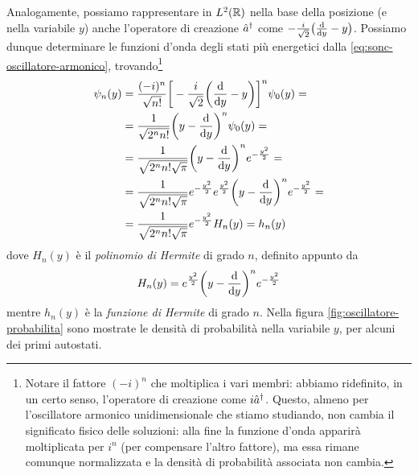 Analogamente, possiamo rappresentare in $L^2(\mathbb{R})$ nella base della posizione (e nella variabile $y$) anche l'operatore di creazione ${\hat{a}}^\dagger$ come $-\frac{i}{\sqrt{2}}\big(\frac{\textup{d} {}}{\textup{d} {y}}-y\big)$.
Possiamo dunque determinare le funzioni d'onda degli stati più energetici dalla \eqref{eq:sonc-oscillatore-armonico}, trovando\footnote{Notare il fattore $(-i)^n$ che moltiplica i vari membri: abbiamo ridefinito, in un certo senso, l'operatore di creazione come $i{\hat{a}}^\dagger$. Questo, almeno per l'oscillatore armonico unidimensionale che stiamo studiando, non cambia il significato fisico delle soluzioni: alla fine la funzione d'onda apparirà moltiplicata per $i^n$ (per compensare l'altro fattore), ma essa rimane comunque normalizzata e la densità di probabilità associata non cambia.}
\begin{equation}
	\begin{split}
		\psi_n(y)&=\frac{(-i)^n}{\sqrt{n!}}\bigg[-\frac{i}{\sqrt{2}}\bigg(\frac{\textup{d} {}}{\textup{d} {y}}-y\bigg)\bigg]^n\psi_0(y)=\\
		&=\frac1{\sqrt{2^nn!}}\bigg(y-\frac{\textup{d} {}}{\textup{d} {y}}\bigg)^n\psi_0(y)=\\
		&=\frac1{\sqrt{2^nn!\sqrt{\pi}}}\bigg(y-\frac{\textup{d} {}}{\textup{d} {y}}\bigg)^ne^{-\frac{y^2}2}=\\
		&=\frac1{\sqrt{2^nn!\sqrt{\pi}}}e^{-\frac{y^2}2}e^{\frac{y^2}2}\bigg(y-\frac{\textup{d} {}}{\textup{d} {y}}\bigg)^ne^{-\frac{y^2}2}=\\
		&=\frac1{\sqrt{2^nn!\sqrt{\pi}}}e^{-\frac{y^2}2}H_n(y)=h_n(y)
	\end{split}
	\label{eq:autofunzioni-oscillatore-hermite}
\end{equation}
dove $H_n(y)$ è il \emph{polinomio di Hermite} di grado $n$, definito appunto da
\begin{equation}
	H_n(y)=e^{\frac{y^2}2}\bigg(y-\frac{\textup{d} {}}{\textup{d} {y}}\bigg)^ne^{-\frac{y^2}2}
	\label{eq:def-polinomio-hermite}
\end{equation}
mentre $h_n(y)$ è la \emph{funzione di Hermite} di grado $n$.
Nella figura \ref{fig:oscillatore-probabilita} sono mostrate le densità di probabilità nella variabile $y$, per alcuni dei primi autostati.


